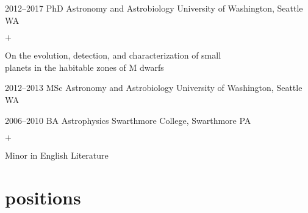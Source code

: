 \documentclass[]{luger-cv} %
\begin{document}
\begin{entrylist}


\entry
{2012--2017}
{PhD {\normalfont Astronomy and Astrobiology}}
{University of Washington, Seattle WA}
{%
\vspace{-1em}
\begin{list}{$+$}{\cvlist}
\item On the evolution, detection, and characterization of small \\ planets in the habitable zones of M dwarfs
\end{list}
}


\entry
{2012--2013}
{MSc {\normalfont Astronomy and Astrobiology}}
{University of Washington, Seattle WA}


\entry
{2006--2010}
{BA {\normalfont Astrophysics}}
{Swarthmore College, Swarthmore PA}
{\vspace{-1em}
\begin{list}{$+$}{\cvlist}
\item Minor in English Literature
\end{list}}


\end{entrylist}




\section{positions}
\end{document}
